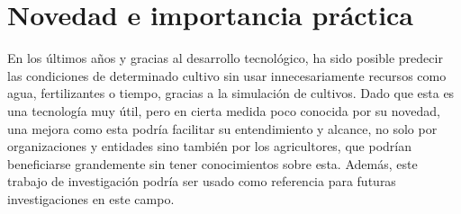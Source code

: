 \section*{Novedad e importancia práctica}
En los últimos años y gracias al desarrollo tecnológico, ha sido posible predecir las condiciones de determinado cultivo sin usar innecesariamente recursos como agua, fertilizantes o tiempo, gracias a la simulación de cultivos. Dado que esta es una tecnología muy útil, pero en cierta medida poco conocida por su novedad,  una mejora como esta podría facilitar su entendimiento y alcance, no solo por organizaciones y entidades sino también por los agricultores, que podrían beneficiarse grandemente sin tener conocimientos sobre esta. Además, este trabajo de investigación podría ser usado como referencia para futuras investigaciones en este campo.





















